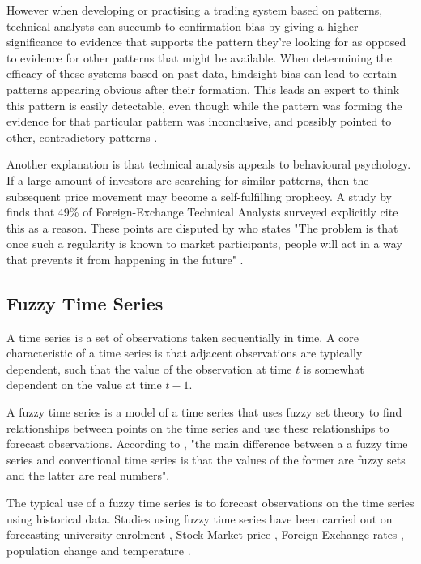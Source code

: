 \documentclass[12pt, oneside, a4paper]{article}
\theoremstyle{definition}
\begin{document}
However when developing or practising a trading system based on patterns, technical analysts can succumb to confirmation bias by giving a higher significance to evidence that supports the pattern they're looking for as opposed to evidence for other patterns that might be available. When determining the efficacy of these systems based on past data, hindsight bias can lead to certain patterns appearing obvious after their formation. This leads an expert to think this pattern is easily detectable, even though while the pattern was forming the evidence for that particular pattern was inconclusive, and possibly pointed to other, contradictory patterns \cite[p.~62]{aronson2011evidence}.

Another explanation is that technical analysis appeals to behavioural psychology. If a large amount of investors are searching for similar patterns, then the subsequent price movement may become a self-fulfilling prophecy. A study by \cite{examininguse1997} finds that 49\% of Foreign-Exchange Technical Analysts surveyed explicitly cite this as a reason. These points are disputed by \cite[p.~162]{randomwalk2012} who states "The problem is that once such a regularity is known to market participants, people will act in a way that prevents it from happening in the future" .

\subsection{Fuzzy Time Series}

\label{fts}

A time series is a set of observations taken sequentially in time. A core characteristic of a time series is that adjacent observations are typically dependent, such that the value of the observation at time $t$ is somewhat dependent on the value at time $t-1$.

A fuzzy time series is a model of a time series that uses fuzzy set theory to find relationships between points on the time series and use these relationships to forecast observations. According to \cite{chen1996forecasting}, "the main difference between a a fuzzy time series and conventional time series is that the values of the former are fuzzy sets and the latter are real numbers".

The typical use of a fuzzy time series is to forecast observations on the time series using historical data. Studies using fuzzy time series have been carried out on forecasting university enrolment \citep{song1993forecasting, song1994forecasting, chen1996forecasting, tsai2000forecasting, chen2004new, cheng2006trend, lee2006pattern, huarng2006ratio, tsaur2012fuzzy}, Stock Market price \citep{huarng2005type, cheng2006trend, lee2006pattern, huarng2006ratio, Chen2007fib, chu2009fuzzy}, Foreign-Exchange rates \citep{tsaur2012fuzzy}, population change \citep{tsai1999study} and temperature \citep{temperatureprediction2000, lee2006pattern}. 
\end{document}
